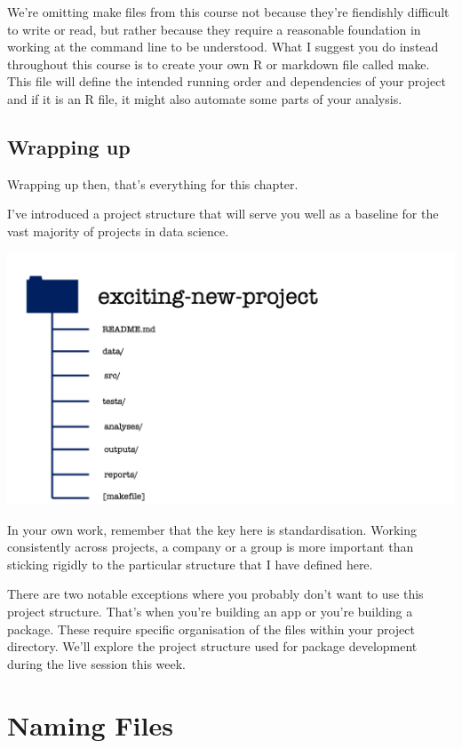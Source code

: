 \documentclass[
  12pt,
]{book}
\begin{document}
We're omitting make files from this course not because they're fiendishly difficult to write or read, but rather because they require a reasonable foundation in working at the command line to be understood. What I suggest you do instead throughout this course is to create your own R or markdown file called make. This file will define the intended running order and dependencies of your project and if it is an R file, it might also automate some parts of your analysis.

\hypertarget{wrapping-up}{%
\section{Wrapping up}\label{wrapping-up}}

Wrapping up then, that's everything for this chapter.

I've introduced a project structure that will serve you well as a baseline for the vast majority of projects in data science.

\includegraphics[width=0.8\linewidth]{images/101-workflows-organising-your-work/directory-structure-drawings/directory-structure-drawing-33}

In your own work, remember that the key here is standardisation. Working consistently across projects, a company or a group is more important than sticking rigidly to the particular structure that I have defined here.

There are two notable exceptions where you probably don't want to use this project structure. That's when you're building an app or you're building a package. These require specific organisation of the files within your project directory. We'll
explore the project structure used for package development during the live
session this week.

\hypertarget{workflows-naming}{%
\chapter{Naming Files}\label{workflows-naming}}
\end{document}
